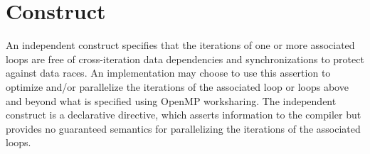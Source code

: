 %
%
%
%
%
%
%
%
%
%
%
%
%


\section{ Construct}
\label{sec:independent Construct}
\summary
An independent construct specifies that the iterations of one or more
associated loops are free of cross-iteration data dependencies and
synchronizations to protect against data races. An implementation may choose
to use this assertion to optimize and/or parallelize the iterations of the
associated loop or loops above and beyond what is specified using OpenMP
worksharing. The independent construct is a declarative directive, which
asserts information to the compiler but provides no guaranteed semantics for
parallelizing the iterations of the associated loops.

